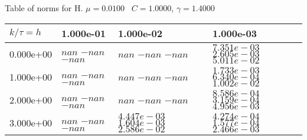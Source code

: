 \begin{center}
Table of norms for H. $\mu = 0.0100$ \, $C = 1.0000$, $\gamma = 1.4000$
  
\begin{tabular}{|p{1in}|p{1in}|p{1in}|p{1in}|} \hline
$k / \tau = h$ &1.000e-01 &1.000e-02 &1.000e-03 \\ \hline 
0.000e+00 & $nan$  $-nan$  $-nan$  & $nan$  $-nan$  $-nan$  & $7.351e-03$  $2.605e-03$  $5.011e-02$  \\ \hline 
1.000e+00 & $nan$  $-nan$  $-nan$  & $nan$  $-nan$  $-nan$  & $1.733e-03$  $6.340e-04$  $1.002e-02$  \\ \hline 
2.000e+00 & $nan$  $-nan$  $-nan$  & $nan$  $-nan$  $-nan$  & $8.586e-04$  $3.159e-04$  $4.956e-03$  \\ \hline 
3.000e+00 & $nan$  $-nan$  $-nan$  & $4.447e-03$  $1.604e-03$  $2.586e-02$  & $4.274e-04$  $1.577e-04$  $2.466e-03$  \\ \hline 

\end{tabular}\\[20pt]
\end{center}
